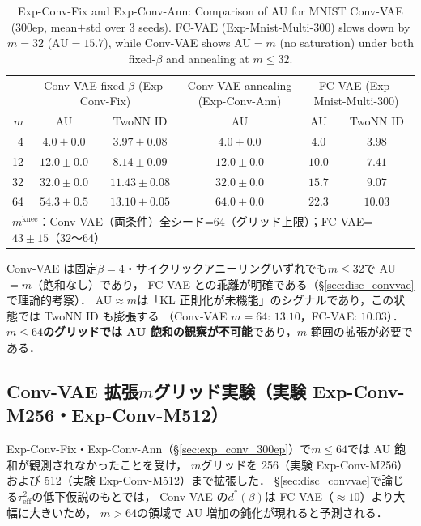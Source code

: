 \documentclass[11pt,a4paper]{jsarticle}
\newcommand{\mknee}{m^{\mathrm{knee}}}
\begin{document}
\begin{table}[H]
\centering
\caption{Exp-Conv-Fix and Exp-Conv-Ann: Comparison of AU for MNIST Conv-VAE (300ep, mean$\pm$std over 3 seeds). FC-VAE (Exp-Mnist-Multi-300) slows down by $m=32$ (AU$=15.7$), while Conv-VAE shows AU$=m$ (no saturation) under both fixed-$\beta$ and annealing at $m \leq 32$.}
\label{tab:eh_conv_vae}
\small
\begin{tabular}{r ccc cc}
\toprule
 & \multicolumn{2}{c}{Conv-VAE fixed-$\beta$ (Exp-Conv-Fix)} & \multicolumn{1}{c}{Conv-VAE annealing (Exp-Conv-Ann)} & \multicolumn{2}{c}{FC-VAE (Exp-Mnist-Multi-300)} \\
$m$ & AU & TwoNN ID & AU & AU & TwoNN ID \\
\midrule
 4 & $4.0\pm0.0$ & $3.97\pm0.08$ & $4.0\pm0.0$ & $4.0$ & $3.98$ \\
12 & $12.0\pm0.0$ & $8.14\pm0.09$ & $12.0\pm0.0$ & $10.0$ & $7.41$ \\
32 & $32.0\pm0.0$ & $11.43\pm0.08$ & $32.0\pm0.0$ & $15.7$ & $9.07$ \\
64 & $54.3\pm0.5$ & $13.10\pm0.05$ & $64.0\pm0.0$ & $22.3$ & $10.03$ \\
\midrule
\multicolumn{6}{l}{$\mknee$：Conv-VAE（両条件）全シード=64（グリッド上限）；FC-VAE=$43\pm15$（32〜64）} \\
\bottomrule
\end{tabular}
\end{table}

Conv-VAE は固定$\beta=4$・サイクリックアニーリングいずれでも$m \leq 32$で AU$=m$（飽和なし）であり，
FC-VAE との乖離が明確である（§\ref{sec:disc_convvae}で理論的考察）．
AU$\approx m$は「KL 正則化が未機能」のシグナルであり，この状態では TwoNN ID も膨張する
（Conv-VAE $m=64$: $13.10$，FC-VAE: $10.03$）．
\textbf{$m \leq 64$のグリッドでは AU 飽和の観察が不可能}であり，$m$ 範囲の拡張が必要である．

\subsection{Conv-VAE 拡張$m$グリッド実験（実験 Exp-Conv-M256・Exp-Conv-M512）}\label{sec:exp_en}

Exp-Conv-Fix・Exp-Conv-Ann（§\ref{sec:exp_conv_300ep}）で$m \leq 64$では AU 飽和が観測されなかったことを受け，
$m$グリッドを 256（実験 Exp-Conv-M256）および 512（実験 Exp-Conv-M512）まで拡張した．
§\ref{sec:disc_convvae}で論じる$\tau^2_\mathrm{eff}$の低下仮説のもとでは，
Conv-VAE の$d^*(\beta)$は FC-VAE（$\approx 10$）より大幅に大きいため，
$m>64$の領域で AU 増加の鈍化が現れると予測される．
\end{document}
